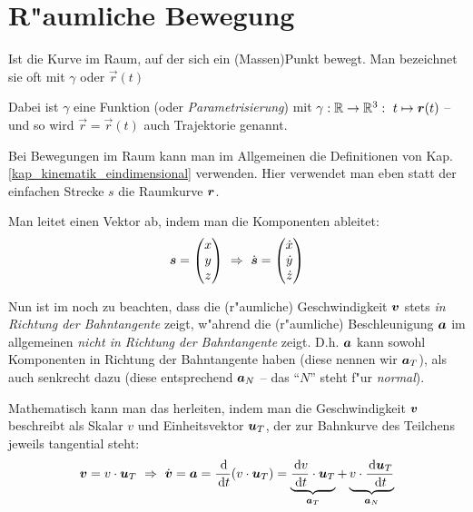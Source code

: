 \section{R"aumliche Bewegung}


\begin{Def}[Trajektorie]
   Ist die Kurve im Raum, auf der sich ein (Massen)Punkt bewegt. Man
   bezeichnet sie oft mit $\gamma$ oder $\vec r(t)$
\end{Def}
Dabei ist $\gamma$ eine Funktion (oder
\emph{Parametrisierung}) mit $\gamma : \mathbb
R \to \mathbb R^3: ~ t \mapsto \boldsymbol{r}(t)$ -- und so wird $\vec r = \vec
r(t)$ auch Trajektorie genannt.

Bei Bewegungen im Raum kann man im Allgemeinen die Definitionen von
Kap. \ref{kap_kinematik_eindimensional} verwenden. Hier verwendet man
eben statt der einfachen Strecke $s$ die Raumkurve $\boldsymbol{r}$.

\begin{Wichtig}
    Man leitet
   einen Vektor ab, indem man die Komponenten ableitet:
     $$
      \boldsymbol{s} = \begin{pmatrix}
                   x\\y\\z
              \end{pmatrix} ~ \Rightarrow ~
              \dot{\boldsymbol{s}} = \begin{pmatrix}
                                  \dot x\\\dot y\\\dot z
                             \end{pmatrix}
     $$
\end{Wichtig}


Nun ist im noch zu beachten, dass die (r"aumliche) Geschwindigkeit $\boldsymbol{v}$ stets \emph{in Richtung der Bahntangente} zeigt, w"ahrend die
(r"aumliche) Beschleunigung $\boldsymbol{a}$ im allgemeinen \emph{nicht in
  Richtung der Bahntangente} zeigt. D.h. $\boldsymbol{a}$ kann sowohl
Komponenten in Richtung der Bahntangente haben (diese nennen wir $\boldsymbol{a}_T$), als auch senkrecht dazu (diese entsprechend $\boldsymbol{a}_N$ -- das
"`$N$"' steht f"ur \emph{normal}).

Mathematisch kann man das herleiten, indem man die Geschwindigkeit $\boldsymbol{v}$ beschreibt als Skalar $v$ und Einheitsvektor $\boldsymbol{u}_T$, der zur
Bahnkurve des Teilchens jeweils tangential steht:
$$
\boldsymbol{v} = v \cdot \boldsymbol{u}_T ~ \Rightarrow ~ \dot{\boldsymbol{v}} = \boldsymbol{a} =
\frac{\, \mathrm{d}}{\, \mathrm{d} t} (v \cdot \boldsymbol{u}_T) = \underbrace{\frac{\, \mathrm{d}
    v}{\, \mathrm{d} t} \cdot \boldsymbol{u}_T}_{\boldsymbol{a}_T} + \underbrace{v \cdot
  \frac{\, \mathrm{d} \boldsymbol{u}_T}{\, \mathrm{d} t}}_{\boldsymbol{a}_N}
$$

